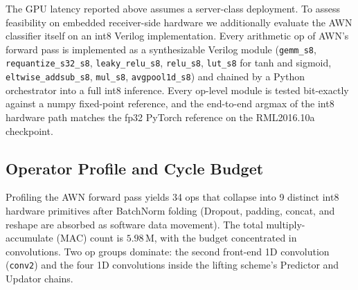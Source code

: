 The GPU latency reported above assumes a server-class deployment. To assess
feasibility on embedded receiver-side hardware we additionally evaluate the
AWN classifier itself on an int8 Verilog implementation. Every arithmetic
op of AWN's forward pass is implemented as a synthesizable Verilog module
(\texttt{gemm\_s8}, \texttt{requantize\_s32\_s8}, \texttt{leaky\_relu\_s8},
\texttt{relu\_s8}, \texttt{lut\_s8} for tanh and sigmoid,
\texttt{eltwise\_addsub\_s8}, \texttt{mul\_s8}, \texttt{avgpool1d\_s8}) and
chained by a Python orchestrator into a full int8 inference. Every op-level
module is tested bit-exactly against a numpy fixed-point reference, and the
end-to-end argmax of the int8 hardware path matches the fp32 PyTorch
reference on the RML2016.10a checkpoint.

\subsection{Operator Profile and Cycle Budget}

Profiling the AWN forward pass yields 34 ops that collapse into 9 distinct
int8 hardware primitives after BatchNorm folding (Dropout, padding, concat,
and reshape are absorbed as software data movement). The total multiply-
accumulate (MAC) count is $5.98\,\text{M}$, with the budget concentrated in
convolutions. Two op groups dominate: the second front-end 1D convolution
(\texttt{conv2}) and the four 1D convolutions inside the lifting scheme's
Predictor and Updator chains.

